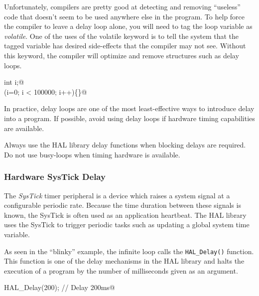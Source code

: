 \documentclass[11pt,fleqn]{book} %
\makeatletter
\newcommand{\ilcode}[1]{
    \begin{center} \parskip=-15pt \colorbox{gray!20!white}{
        \parbox{\columnwidth-2\fboxsep}{
            \lstinline@#1@
        }
    } \end{center}
}
\makeatother
\begin{document}
Unfortunately, compilers are pretty good at detecting and removing ``useless'' code that doesn't seem to be used anywhere else in the program. To help force the compiler to leave a delay loop alone, you will need to tag the loop variable as \textit{volatile}. One of the uses of the volatile keyword is to tell the system that the tagged variable has desired side-effects that the compiler may not see. Without this keyword, the compiler will optimize and remove structures such as delay loops.


\smallskip
\colorbox{gray!20!white}{
    \centering
    \parbox{\linewidth-2\fboxsep}{
        \lstinline@volatile int i;@ \\
        \lstinline@for(i=0; i < 100000; i++)\{\}@ 
    }
}
\smallskip

In practice, delay loops are one of the most least-effective ways to introduce delay into a program. If possible, avoid using delay loops if hardware timing capabilities are available. 

\begin{warning}
    Always use the HAL library delay functions when blocking delays are required. Do not use busy-loops when timing hardware is available.
\end{warning}

\subsubsection{Hardware SysTick Delay}

The \textit{SysTick} timer peripheral is a device which raises a system signal at a configurable periodic rate. Because the time duration between these signals is known, the SysTick is often used as an application heartbeat. The HAL library uses the SysTick to trigger periodic tasks such as updating a global system time variable. 

As seen in the ``blinky'' example, the infinite loop calls the \texttt{HAL\_Delay()} function. This function is one of the delay mechanisms in the HAL library and halts the execution of a program by the number of milliseconds given as an argument. 

\ilcode{HAL_Delay(200); // Delay 200ms}
\end{document}
